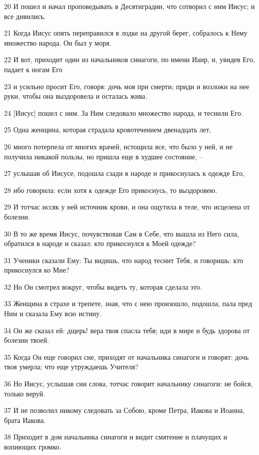 \par 20 И пошел и начал проповедывать в Десятиградии, что сотворил с ним Иисус; и все дивились.
\par 21 Когда Иисус опять переправился в лодке на другой берег, собралось к Нему множество народа. Он был у моря.
\par 22 И вот, приходит один из начальников синагоги, по имени Иаир, и, увидев Его, падает к ногам Его
\par 23 и усильно просит Его, говоря: дочь моя при смерти; приди и возложи на нее руки, чтобы она выздоровела и осталась жива.
\par 24 [Иисус] пошел с ним. За Ним следовало множество народа, и теснили Его.
\par 25 Одна женщина, которая страдала кровотечением двенадцать лет,
\par 26 много потерпела от многих врачей, истощила все, что было у ней, и не получила никакой пользы, но пришла еще в худшее состояние, --
\par 27 услышав об Иисусе, подошла сзади в народе и прикоснулась к одежде Его,
\par 28 ибо говорила: если хотя к одежде Его прикоснусь, то выздоровею.
\par 29 И тотчас иссяк у ней источник крови, и она ощутила в теле, что исцелена от болезни.
\par 30 В то же время Иисус, почувствовав Сам в Себе, что вышла из Него сила, обратился в народе и сказал: кто прикоснулся к Моей одежде?
\par 31 Ученики сказали Ему: Ты видишь, что народ теснит Тебя, и говоришь: кто прикоснулся ко Мне?
\par 32 Но Он смотрел вокруг, чтобы видеть ту, которая сделала это.
\par 33 Женщина в страхе и трепете, зная, что с нею произошло, подошла, пала пред Ним и сказала Ему всю истину.
\par 34 Он же сказал ей: дщерь! вера твоя спасла тебя; иди в мире и будь здорова от болезни твоей.
\par 35 Когда Он еще говорил сие, приходят от начальника синагоги и говорят: дочь твоя умерла; что еще утруждаешь Учителя?
\par 36 Но Иисус, услышав сии слова, тотчас говорит начальнику синагоги: не бойся, только веруй.
\par 37 И не позволил никому следовать за Собою, кроме Петра, Иакова и Иоанна, брата Иакова.
\par 38 Приходит в дом начальника синагоги и видит смятение и плачущих и вопиющих громко.
